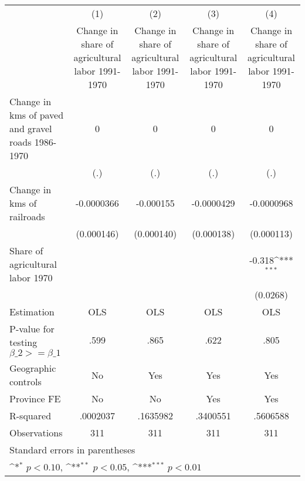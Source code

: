 {
\def\sym#1{\ifmmode^{#1}\else\(^{#1}\)\fi}
\begin{tabular}{l*{4}{c}}
\hline\hline
                    &\multicolumn{1}{c}{(1)}&\multicolumn{1}{c}{(2)}&\multicolumn{1}{c}{(3)}&\multicolumn{1}{c}{(4)}\\
                    &\multicolumn{1}{c}{Change in share of agricultural labor 1991-1970}&\multicolumn{1}{c}{Change in share of agricultural labor 1991-1970}&\multicolumn{1}{c}{Change in share of agricultural labor 1991-1970}&\multicolumn{1}{c}{Change in share of agricultural labor 1991-1970}\\
\hline
Change in kms of paved and gravel roads 1986-1970&           0         &           0         &           0         &           0         \\
                    &         (.)         &         (.)         &         (.)         &         (.)         \\
[1em]
Change in kms of railroads&  -0.0000366         &   -0.000155         &  -0.0000429         &  -0.0000968         \\
                    &  (0.000146)         &  (0.000140)         &  (0.000138)         &  (0.000113)         \\
[1em]
Share of agricultural labor 1970&                     &                     &                     &      -0.318\sym{***}\\
                    &                     &                     &                     &    (0.0268)         \\
\hline
Estimation          &         OLS         &         OLS         &         OLS         &         OLS         \\
P-value for testing $\beta\_2 >= \beta\_1$&        .599         &        .865         &        .622         &        .805         \\
Geographic controls &          No         &         Yes         &         Yes         &         Yes         \\
Province FE         &          No         &          No         &         Yes         &         Yes         \\
R-squared           &    .0002037         &    .1635982         &    .3400551         &    .5606588         \\
Observations        &         311         &         311         &         311         &         311         \\
\hline\hline
\multicolumn{5}{l}{\footnotesize Standard errors in parentheses}\\
\multicolumn{5}{l}{\footnotesize \sym{*} \(p<0.10\), \sym{**} \(p<0.05\), \sym{***} \(p<0.01\)}\\
\end{tabular}
}
